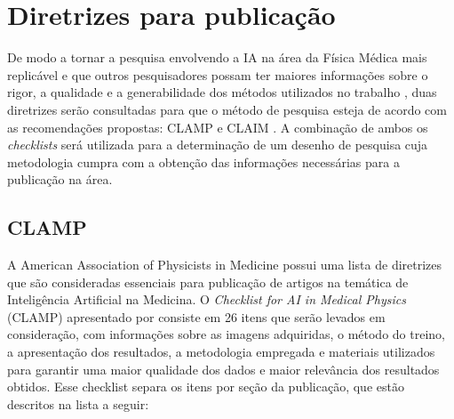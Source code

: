 
\section{Diretrizes para publicação}

De modo a tornar a pesquisa envolvendo a IA na área da Física Médica mais replicável e que outros pesquisadores possam ter maiores informações sobre o rigor, a qualidade e a generabilidade dos métodos utilizados no trabalho \cite{Mongan:2020}, duas diretrizes serão consultadas para que o método de pesquisa esteja de acordo com as recomendações propostas: CLAMP \cite{ElNaqa:2021} e CLAIM \cite{Mongan:2020}. A combinação de ambos os \textit{checklists} será utilizada para a determinação de um desenho de pesquisa cuja metodologia cumpra com a obtenção das informações necessárias para a publicação na área.

\subsection{CLAMP}
A American Association of Physicists in Medicine possui uma lista de diretrizes que são consideradas essenciais para publicação de artigos na temática de Inteligência Artificial na Medicina. O \textit{Checklist for AI in Medical Physics} (CLAMP) apresentado por \cite{ElNaqa:2021} consiste em 26 itens que serão levados em consideração, com informações sobre as imagens adquiridas, o método do treino, a apresentação dos resultados, a metodologia empregada e materiais utilizados para garantir uma maior qualidade dos dados e maior relevância dos resultados obtidos. Esse checklist separa os itens por seção da publicação, que estão descritos na lista a seguir:

